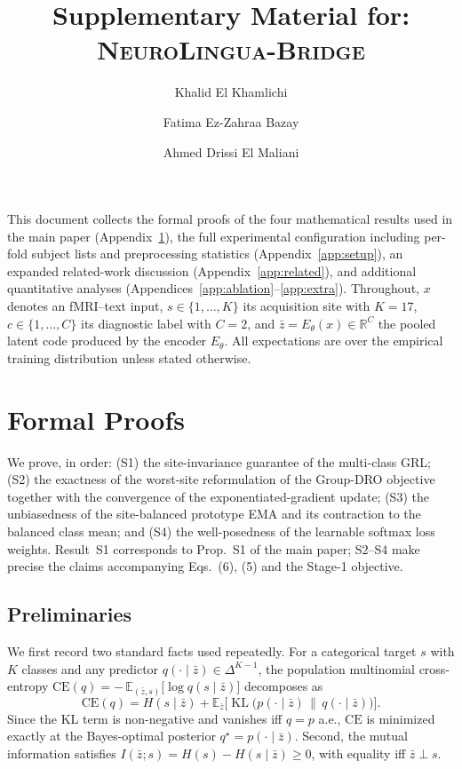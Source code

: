 \documentclass[runningheads]{llncs}
\newcommand{\method}{\textsc{NeuroLingua-Bridge}}
\DeclareMathOperator{\KL}{KL}
\begin{document}
\title{Supplementary Material for: \method{}}
\author{Khalid El Khamlichi \and Fatima Ez-Zahraa Bazay \and Ahmed Drissi El Maliani}
\maketitle
This document collects the formal proofs of the four mathematical results used in the main paper (Appendix~\ref{app:proofs}), the full experimental configuration including per-fold subject lists and preprocessing statistics (Appendix~\ref{app:setup}), an expanded related-work discussion (Appendix~\ref{app:related}), and additional quantitative analyses (Appendices~\ref{app:ablation}--\ref{app:extra}). Throughout, $x$ denotes an fMRI--text input, $s\in\{1,\dots,K\}$ its acquisition site with $K{=}17$, $c\in\{1,\dots,C\}$ its diagnostic label with $C{=}2$, and $\bar z = E_\theta(x)\in\mathbb{R}^{C}$ the pooled latent code produced by the encoder $E_\theta$. All expectations are over the empirical training distribution unless stated otherwise.
%
\section{Formal Proofs}
\label{app:proofs}
We prove, in order: (S1) the site-invariance guarantee of the multi-class GRL; (S2) the exactness of the worst-site reformulation of the Group-DRO objective together with the convergence of the exponentiated-gradient update; (S3) the unbiasedness of the site-balanced prototype EMA and its contraction to the balanced class mean; and (S4) the well-posedness of the learnable softmax loss weights. Result~S1 corresponds to Prop.~S1 of the main paper; S2--S4 make precise the claims accompanying Eqs.~(6), (5) and the Stage-1 objective.
\subsection{Preliminaries}
We first record two standard facts used repeatedly. For a categorical target $s$ with $K$ classes and any predictor $q(\cdot\mid\bar z)\in\Delta^{K-1}$, the population multinomial cross-entropy $\mathrm{CE}(q) = -\,\mathbb{E}_{(\bar z,s)}\!\big[\log q(s\mid\bar z)\big]$ decomposes as
\begin{equation}
\mathrm{CE}(q) = H(s\mid\bar z) + \mathbb{E}_{\bar z}\!\big[\KL\!\big(p(\cdot\mid\bar z)\,\|\,q(\cdot\mid\bar z)\big)\big].
\label{eq:ce-decomp}
\end{equation}
Since the KL term is non-negative and vanishes iff $q=p$ a.e., $\mathrm{CE}$ is minimized exactly at the Bayes-optimal posterior $q^\star=p(\cdot\mid\bar z)$. Second, the mutual information satisfies $I(\bar z;s)=H(s)-H(s\mid\bar z)\ge 0$, with equality iff $\bar z\perp s$.
\end{document}

